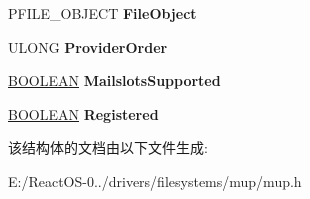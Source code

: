 \begin{DoxyCompactItemize}
\item 
\mbox{\label{struct___m_u_p___u_n_c_a558bf07137edae9770c110c4b507d37e}} 
P\+F\+I\+L\+E\+\_\+\+O\+B\+J\+E\+CT {\bfseries File\+Object}
\item 
\mbox{\label{struct___m_u_p___u_n_c_afecc42303e3c3be1338e4ecea2632fe6}} 
U\+L\+O\+NG {\bfseries Provider\+Order}
\item 
\mbox{\label{struct___m_u_p___u_n_c_a567357e7cdf6228e98211a826ce720e3}} 
\hyperlink{_processor_bind_8h_a112e3146cb38b6ee95e64d85842e380a}{B\+O\+O\+L\+E\+AN} {\bfseries Mailslots\+Supported}
\item 
\mbox{\label{struct___m_u_p___u_n_c_a448e3a70dbf1e83a252f25b21d7e2dd8}} 
\hyperlink{_processor_bind_8h_a112e3146cb38b6ee95e64d85842e380a}{B\+O\+O\+L\+E\+AN} {\bfseries Registered}
\end{DoxyCompactItemize}


该结构体的文档由以下文件生成\+:\begin{DoxyCompactItemize}
\item 
E\+:/\+React\+O\+S-\/0../drivers/filesystems/mup/mup.\+h\end{DoxyCompactItemize}

